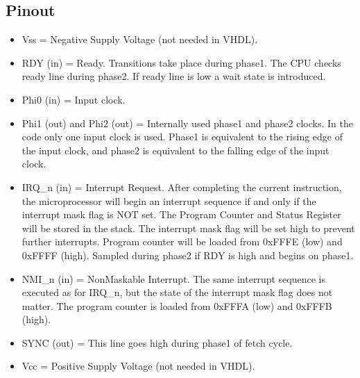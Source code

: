 \documentclass[letterpaper,10pt,english]{sphinxmanual}
\begin{document}
\subsection{Pinout}
\label{\detokenize{core_6502:pinout}}\label{\detokenize{core_6502:id5}}
\noindent{}
\begin{itemize}
\item {} 
\sphinxAtStartPar
Vss = Negative Supply Voltage (not needed in VHDL).

\item {} 
\sphinxAtStartPar
RDY (in) = Ready. Transitions take place during phase\sphinxhyphen{}1. The CPU checks ready line
during phase\sphinxhyphen{}2. If ready line is low a wait state is introduced.

\item {} 
\sphinxAtStartPar
Phi0 (in) = Input clock.

\item {} 
\sphinxAtStartPar
Phi1 (out) and Phi2 (out) = Internally used phase\sphinxhyphen{}1 and phase\sphinxhyphen{}2 clocks. In the
code only one input clock is used. Phase\sphinxhyphen{}1 is equivalent to the rising edge of
the input clock, and phase\sphinxhyphen{}2 is equivalent to the falling edge of the input
clock.

\item {} 
\sphinxAtStartPar
IRQ\_n (in) = Interrupt Request. After completing the current instruction, the
microprocessor will begin an interrupt sequence if and only if the interrupt
mask flag is NOT set. The Program Counter and Status Register
will be stored in the stack. The interrupt mask flag will be set high to
prevent further interrupts. Program counter will be loaded from 0xFFFE (low)
and 0xFFFF (high). Sampled during phase\sphinxhyphen{}2 if RDY is high and begins on phase\sphinxhyphen{}1.

\item {} 
\sphinxAtStartPar
NMI\_n (in) = Non\sphinxhyphen{}Maskable Interrupt. The same interrupt sequence is executed
as for IRQ\_n, but the state of the interrupt mask flag does not matter. The
program counter is loaded from 0xFFFA (low) and 0xFFFB (high).

\item {} 
\sphinxAtStartPar
SYNC (out) = This line goes high during phase\sphinxhyphen{}1 of fetch cycle.

\item {} 
\sphinxAtStartPar
Vcc = Positive Supply Voltage (not needed in VHDL).


\end{itemize}
\end{document}
